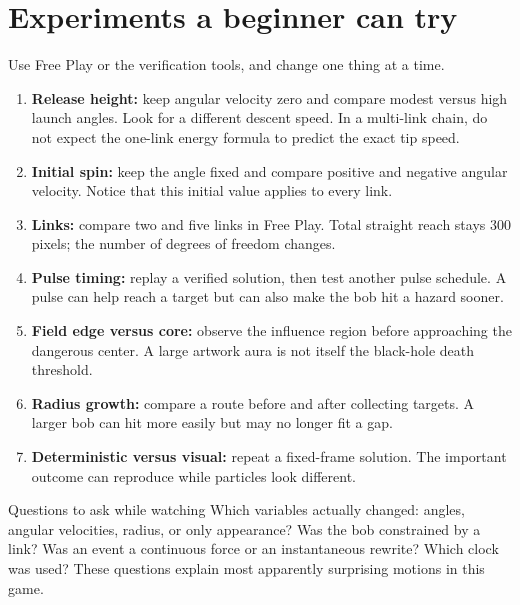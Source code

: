 \documentclass[11pt,a4paper]{article}
\begin{document}
\section{Experiments a beginner can try}
Use Free Play or the verification tools, and change one thing at a time.
\begin{enumerate}
\item \textbf{Release height:} keep angular velocity zero and compare modest versus high launch angles. Look for a different descent speed. In a multi-link chain, do not expect the one-link energy formula to predict the exact tip speed.
\item \textbf{Initial spin:} keep the angle fixed and compare positive and negative angular velocity. Notice that this initial value applies to every link.
\item \textbf{Links:} compare two and five links in Free Play. Total straight reach stays 300 pixels; the number of degrees of freedom changes.
\item \textbf{Pulse timing:} replay a verified solution, then test another pulse schedule. A pulse can help reach a target but can also make the bob hit a hazard sooner.
\item \textbf{Field edge versus core:} observe the influence region before approaching the dangerous center. A large artwork aura is not itself the black-hole death threshold.
\item \textbf{Radius growth:} compare a route before and after collecting targets. A larger bob can hit more easily but may no longer fit a gap.
\item \textbf{Deterministic versus visual:} repeat a fixed-frame solution. The important outcome can reproduce while particles look different.
\end{enumerate}
\begin{idea}{Questions to ask while watching}
Which variables actually changed: angles, angular velocities, radius, or only appearance? Was the bob constrained by a link? Was an event a continuous force or an instantaneous rewrite? Which clock was used? These questions explain most apparently surprising motions in this game.
\end{idea}

\appendix\clearpage
\end{document}
